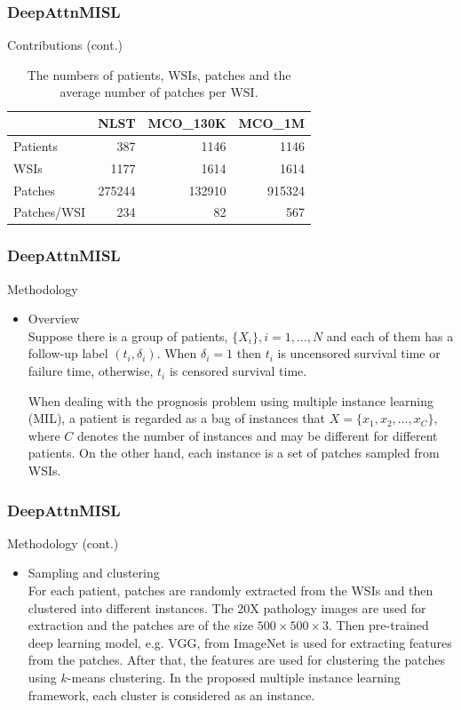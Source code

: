 \documentclass{beamer}
\begin{document}
	\begin{frame}
		\frametitle{DeepAttnMISL}
		Contributions (cont.)
		
		\begin{table}[H]
			\begin{center}
				\begin{tabular}{ | l | r | r | r | }
					\hline
					& NLST & MCO\_130K & MCO\_1M \\
					\hline
					Patients & 387 & 1146 & 1146 \\
					\hline
					WSIs & 1177 & 1614 & 1614 \\
					\hline
					Patches & 275244 & 132910 & 915324 \\
					\hline
					Patches/WSI & 234 & 82 & 567 \\
					\hline
				\end{tabular}
			\end{center}
			\caption{The numbers of patients, WSIs, patches and the average number of patches per WSI.}
		\end{table} 
	\end{frame}

	\begin{frame}
		\frametitle{DeepAttnMISL}
		Methodology
		
		\begin{itemize}
			\item Overview \\
			\vspace{5mm}
			Suppose there is a group of patients, $\{ X_i \}, i = 1, \dots, N$ and each of them has a follow-up label $( t_i, \delta_i )$. When $\delta_i = 1$ then $t_i$ is uncensored survival time or failure time, otherwise, $t_i$ is censored survival time.
			
			When dealing with the prognosis problem using multiple instance learning (MIL), a patient is regarded as a bag of instances that $X = \{ x_1, x_2, \dots, x_C \}$, where $C$ denotes the number of instances and may be different for different patients. On the other hand, each instance is a set of patches sampled from WSIs.
		\end{itemize}
	\end{frame}
	
	\begin{frame}
		\frametitle{DeepAttnMISL}
		Methodology (cont.)
		
		\begin{itemize}
			\item Sampling and clustering \\
			\vspace{5mm}
			For each patient, patches are randomly extracted from the WSIs and then clustered into different instances. The 20X pathology images are used for extraction and the patches are of the size $500 \times 500 \times 3$. Then pre-trained deep learning model, e.g. VGG, from ImageNet is used for extracting features from the patches. After that, the features are used for clustering the patches using $k$-means clustering. In the proposed multiple instance learning framework, each cluster is considered as an instance.
		\end{itemize}
	\end{frame}
\end{document}
